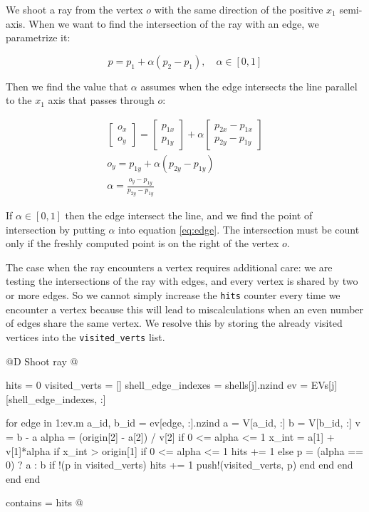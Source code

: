 \documentclass[10pt]{book}
\begin{document}
We shoot a ray from the vertex $o$ with the same direction
of the positive $x_1$ semi-axis.
When we want to find the intersection of the ray with an edge,
we parametrize it:

\begin{equation}
\label{eq:edge}
    p = p_1 + \alpha(p_2-p_1), \quad\alpha\in[0, 1]
\end{equation}

Then we find the value that $\alpha$ assumes when the edge
intersects the line parallel to the $x_1$ axis that passes through $o$:

\begin{gather*}
    \begin{bmatrix}
        o_x \\ o_y
    \end{bmatrix}
    = 
    \begin{bmatrix}
        p_{1x} \\ p_{1y}
    \end{bmatrix}
    +
    \alpha
    \begin{bmatrix}
        p_{2x} - p_{1x} \\ p_{2y} - p_{1y}
    \end{bmatrix} \\
    o_y = p_{1y} + \alpha(p_{2y} - p_{1y}) \\
    \alpha = \frac{o_y - p_{1y}}{p_{2y} - p_{1y}}
\end{gather*}

If $\alpha\in[0, 1]$ then the edge intersect the line, and we find the point
of intersection by putting $\alpha$ into equation \ref{eq:edge}.
The intersection must be count only if the freshly computed point
is on the right of the vertex $o$.

The case when the ray encounters a vertex requires additional care:
we are testing the intersections of the ray with edges, and every
vertex is shared by two or more edges. So we cannot simply increase the 
\texttt{hits} counter every time we encounter a vertex because this will lead
to miscalculations when an even number of edges share the same vertex.
We resolve this by storing the already visited vertices into the 
\texttt{visited\_verts} list.

@D Shoot ray
@{hits = 0
visited_verts = []
shell_edge_indexes = shells[j].nzind
ev = EVs[j][shell_edge_indexes, :]

for edge in 1:ev.m
    a_id, b_id = ev[edge, :].nzind
    a = V[a_id, :]
    b = V[b_id, :]
    v = b - a
    alpha = (origin[2] - a[2]) / v[2]
    if 0 <= alpha <= 1
        x_int = a[1] + v[1]*alpha
        if x_int > origin[1]
            if 0 <= alpha <= 1
                hits += 1
            else
                p = (alpha == 0) ? a : b
                if !(p in visited_verts)
                    hits += 1
                    push!(visited_verts, p)
                end
            end
        end
    end
end

contains = hits %
@}
\end{document}
